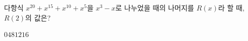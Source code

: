 다항식 $x^{20}+x^{15}+x^{10}+x^5$을 $x^3-x$로 나누었을 때의 나머지를 $R(x)$라 할 때, $R(2)$의 값은?
\begin{choices32}{$0$}{$4$}{$8$}{$12$}{$16$}\end{choices32}
